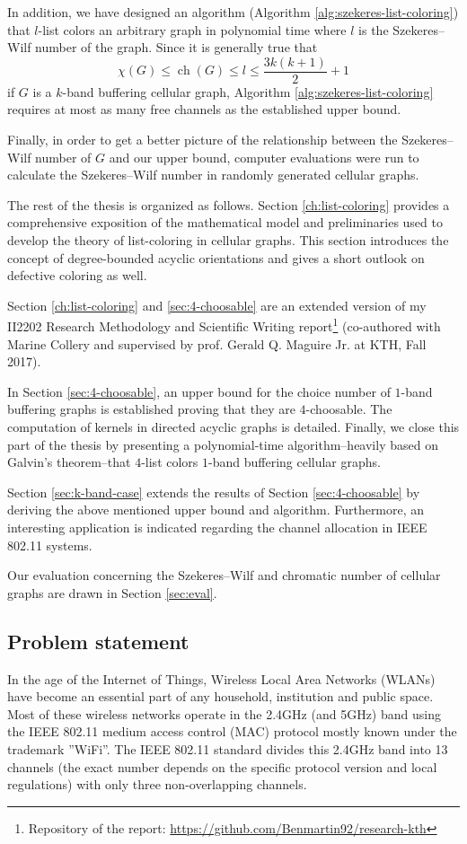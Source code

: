 \documentclass[a4paper, 12pt]{article}
\DeclareMathOperator*{\ch}{ch}
\begin{document}
In addition, we have designed an algorithm (Algorithm \ref{alg:szekeres-list-coloring}) that $l$-list colors an arbitrary graph in polynomial time where $l$ is the Szekeres\---Wilf number of the graph. Since it is generally true that 
$$\chi(G) \leqslant \ch(G) \leqslant l \leqslant \frac{3k(k+1)}{2}+1$$
if $G$ is a $k$-band buffering cellular graph, Algorithm \ref{alg:szekeres-list-coloring} requires at most as many free channels as the established upper bound.

Finally, in order to get a better picture of the relationship between the Szekeres\---Wilf number of $G$ and our upper bound, computer evaluations were run to calculate the Szekeres\---Wilf number in randomly generated cellular graphs.

The rest of the thesis is organized as follows. Section \ref{ch:list-coloring} provides a comprehensive exposition of the mathematical model and preliminaries used to develop the theory of list-coloring in cellular graphs. This section introduces the concept of degree-bounded acyclic orientations and gives a short outlook on defective coloring as well.

Section \ref{ch:list-coloring} and \ref{sec:4-choosable} are an extended version of my II2202 Research Methodology and Scientific Writing report\footnote{Repository of the report: \url{https://github.com/Benmartin92/research-kth}} (co-authored with Marine Collery and supervised by prof. Gerald Q. Maguire Jr. at KTH, Fall 2017).

In Section \ref{sec:4-choosable}, an upper bound for the choice number of $1$-band buffering graphs is established proving that they are $4$-choosable. The computation of kernels in directed acyclic graphs is detailed. Finally, we close this part of the thesis by presenting a polynomial-time algorithm\---heavily based on Galvin's theorem\---that $4$-list colors $1$-band buffering cellular graphs.

Section \ref{sec:k-band-case} extends the results of Section \ref{sec:4-choosable} by deriving the above mentioned upper bound and algorithm. Furthermore, an interesting application is indicated regarding the channel allocation in IEEE 802.11 systems.

Our evaluation concerning the Szekeres\---Wilf and chromatic number of cellular graphs are drawn in Section \ref{sec:eval}.

\subsection{Problem statement}
In the age of the Internet of Things, Wireless Local Area Networks (WLANs) have become an essential part of any household, institution and public space. Most of these wireless networks operate in the 2.4GHz (and 5GHz) band using the IEEE 802.11 medium access control (MAC) protocol mostly known under the trademark ''WiFi''. The IEEE 802.11 standard divides this 2.4GHz band into 13 channels (the exact number depends on the specific protocol version and local regulations) with only three non-overlapping channels.
\end{document}
